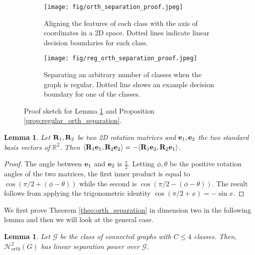 \documentclass{article}
\newtheorem{lemma}[theorem]{Lemma}
\def\ve{{\bf{e}}}
\def\mR{{\bf{R}}}
\def\gG{{\mathcal{G}}}
\def\gH{{\mathcal{H}}}
\def\sR{{\mathbb{R}}}
\begin{document}
\begin{figure}
    \centering
    \begin{subfigure}[b]{0.3\textwidth}
        \centering
        \texttt{[image: fig/orth\_separation\_proof.jpeg]}
        \caption{Aligning the features of each class with the axis of coordinates in a 2D space. Dotted lines indicate linear decision boundaries for each class.}
        \label{fig:orth_separation_proof}
    \end{subfigure}
    \hspace{40pt}
    \begin{subfigure}[b]{0.3\textwidth}
        \centering
        \texttt{[image: fig/reg\_orth\_separation\_proof.jpeg]}
        \caption{Separating an arbitrary number of classes when the graph is regular. Dotted line shows an example decision boundary for one of the classes.}
        \label{fig:reg_orth_separation_proof}
    \end{subfigure}
    \caption{Proof sketch for Lemma \ref{lemma:orth_separation_d2} and Proposition \ref{prop:regular_orth_separation}.}
    \label{fig:orth_separation_all_proofs}
\end{figure}

\begin{lemma}\label{lemma:swap_rotations}
Let $\mR_1, \mR_2$ be two 2D rotation matrices and $\ve_1, \ve_2$ the two standard basis vectors of $\sR^2$. Then $\langle \mR_1 \ve_1, \mR_2 \ve_2\rangle =  - \langle \mR_1 \ve_2, \mR_2 \ve_1 \rangle $.
\end{lemma}

\begin{proof}
The angle between $\ve_1$ and $\ve_2$ is $\frac{\pi}{2}$. Letting $\phi, \theta$ be the positive rotation angles of the two matrices, the first inner product is equal to $\cos(\pi/2 + (\phi - \theta))$ while the second is $\cos(\pi/2 - (\phi - \theta))$. The result follows from applying the trigonometric identity $\cos(\pi/2 + x) = - \sin x$.  
\end{proof}

We first prove Theorem \ref{theo:orth_separation} in dimension two in the following lemma and then we will look at the general case. 

\begin{lemma}\label{lemma:orth_separation_d2}
Let $\gG$ be the class of connected graphs with $C \leq 4$ classes. Then, $\gH_{\mathrm{orth}}^{2}(G)$ has linear separation power over $\gG$.  
\end{lemma}
\end{document}
